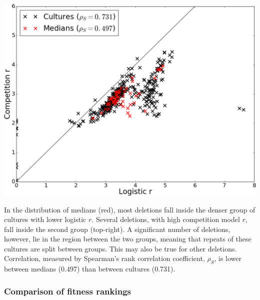 \begin{multicols}{2}
\graphicspath{{images/p15_correlations/}}
\begin{Figure}
  \centering
  \includegraphics[width=\linewidth]{final/r_correlations_median_spearmans_trimmed_2}
  \label{fig:P15_correlations}
\end{Figure}

In the distribution of medians (red), most deletions fall inside the
denser group of cultures with lower logistic \(r\). Several deletions,
with high competition model \(r\), fall inside the second group
(top-right). A significant number of deletions, however, lie in the
region between the two groups, meaning that repeats of these cultures
are split between groups. This may also be true for other
deletions. Correlation, measured by Spearman's rank correlation
coefficient, \(\rho_{S}\), is lower between medians (0.497) than
between cultures (0.731).

\subsubsection{Comparison of fitness rankings}


\end{multicols}
